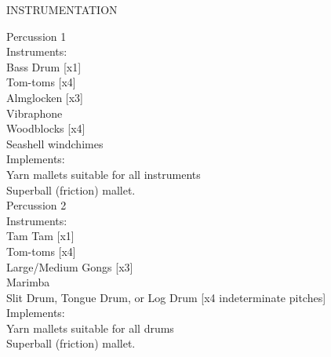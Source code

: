 \documentclass[11pt]{article}
\begin{document}
\begin{center}
\huge INSTRUMENTATION
\end{center}

\hspace*{1cm} Percussion 1
\\
\hspace*{2cm} Instruments:
\\
\hspace*{3cm} Bass Drum [x1]
\\
\hspace*{3cm} Tom-toms [x4]
\\
\hspace*{3cm} Almglocken [x3]
\\
\hspace*{3cm} Vibraphone
\\
\hspace*{3cm} Woodblocks [x4]
\\
\hspace*{3cm} Seashell windchimes
\\
\hspace*{2cm} Implements:
\\
\hspace*{3cm} Yarn mallets suitable for all instruments
\\
\hspace*{3cm} Superball (friction) mallet.
\\
\hspace*{1cm} Percussion 2
\\
\hspace*{2cm} Instruments:
\\
\hspace*{3cm} Tam Tam [x1]
\\
\hspace*{3cm} Tom-toms [x4]
\\
\hspace*{3cm} Large/Medium Gongs [x3]
\\
\hspace*{3cm} Marimba
\\
\hspace*{3cm} Slit Drum, Tongue Drum, or Log Drum [x4 indeterminate pitches]
\\
\hspace*{2cm} Implements:
\\
\hspace*{3cm} Yarn mallets suitable for all drums
\\
\hspace*{3cm} Superball (friction) mallet.
\end{document}
